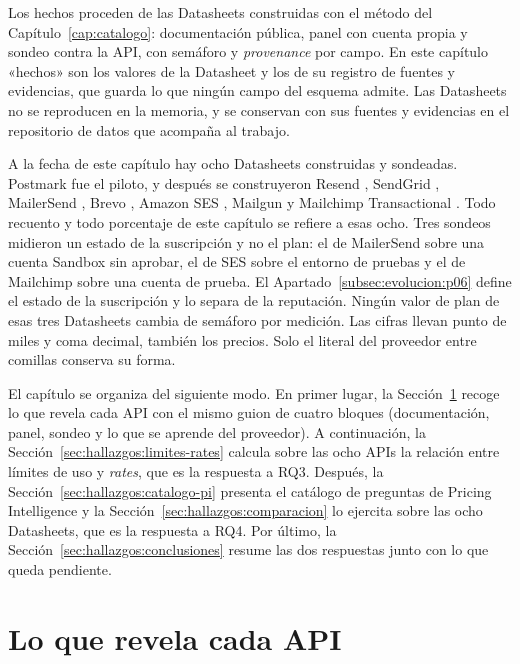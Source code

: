 Los hechos proceden de las Datasheets construidas con el método del
Capítulo~\ref{cap:catalogo}: documentación pública, panel con cuenta
propia y sondeo contra la API, con semáforo y \textit{provenance} por
campo. En este capítulo «hechos» son los valores de la Datasheet y los de
su registro de fuentes y evidencias, que guarda lo que ningún campo del
esquema admite. Las Datasheets no se reproducen en la memoria, y se
conservan con sus fuentes y evidencias en el repositorio de datos que
acompaña al trabajo.

A la fecha de este capítulo hay ocho Datasheets construidas y sondeadas.
Postmark \citep{postmarkpricing} fue el piloto, y después se
construyeron Resend \citep{resendpricing}, SendGrid
\citep{sendgridpricing}, MailerSend \citep{mailersendpricing}, Brevo
\citep{brevopricing}, Amazon SES \citep{sespricing}, Mailgun
\citep{mailgunpricing} y Mailchimp Transactional
\citep{mailchimppricing}. Todo recuento y todo porcentaje de este
capítulo se refiere a esas ocho. Tres sondeos midieron un estado de la
suscripción y no el plan: el de MailerSend sobre una cuenta Sandbox sin
aprobar, el de SES sobre el entorno de pruebas y el de Mailchimp sobre
una cuenta de prueba. El Apartado~\ref{subsec:evolucion:p06} define el estado de la suscripción y lo separa de la reputación. Ningún valor de plan de esas tres Datasheets
cambia de semáforo por medición.
Las cifras llevan punto de miles y coma decimal, también los precios.
Solo el literal del proveedor entre comillas conserva su forma.

El capítulo se organiza del siguiente modo. En primer lugar, la
Sección~\ref{sec:hallazgos:apis} recoge lo que revela cada API con el
mismo guion de cuatro bloques (documentación, panel, sondeo y lo que se
aprende del proveedor). A continuación, la
Sección~\ref{sec:hallazgos:limites-rates} calcula sobre las ocho APIs la
relación entre límites de uso y \textit{rates}, que es la respuesta a
RQ3.
Después, la Sección~\ref{sec:hallazgos:catalogo-pi} presenta el catálogo
de preguntas de Pricing Intelligence y la
Sección~\ref{sec:hallazgos:comparacion} lo ejercita sobre las ocho
Datasheets, que es la respuesta a RQ4. Por último, la
Sección~\ref{sec:hallazgos:conclusiones} resume las dos respuestas junto
con lo que queda pendiente.

\section{Lo que revela cada API}
\label{sec:hallazgos:apis}

